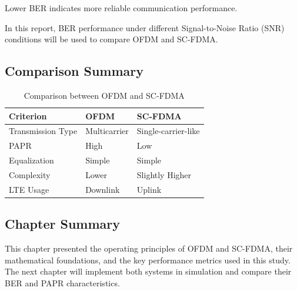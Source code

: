 Lower BER indicates more reliable communication performance.

In this report, BER performance under different Signal-to-Noise Ratio
(SNR) conditions will be used to compare OFDM and SC-FDMA.

\subsection{Comparison Summary}

\begin{table}[H]
\centering
\caption{Comparison between OFDM and SC-FDMA}
\begin{tabularx}{\textwidth}{|>{\raggedright\arraybackslash}X|
>{\centering\arraybackslash}X|
>{\centering\arraybackslash}X|}
\hline
\textbf{Criterion} & \textbf{OFDM} & \textbf{SC-FDMA} \\ \hline
Transmission Type & Multicarrier & Single-carrier-like \\ \hline
PAPR & High & Low \\ \hline
Equalization & Simple & Simple \\ \hline
Complexity & Lower & Slightly Higher \\ \hline
LTE Usage & Downlink & Uplink \\ \hline
\end{tabularx}
\end{table}

\subsection{Chapter Summary}

This chapter presented the operating principles of OFDM and SC-FDMA,
their mathematical foundations, and the key performance metrics used in
this study. The next chapter will implement both systems in simulation
and compare their BER and PAPR characteristics.